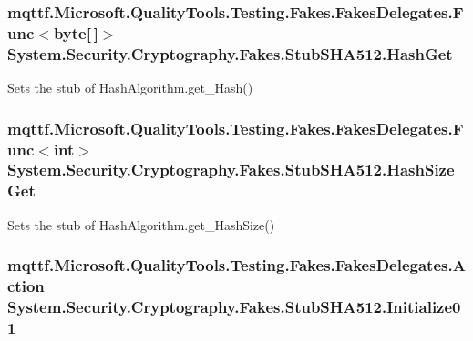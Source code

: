 \hypertarget{class_system_1_1_security_1_1_cryptography_1_1_fakes_1_1_stub_s_h_a512_acd372718f6313b93ee5cfc1d72b85fdf}{
\subsubsection[{Hash\-Get}]{\setlength{\rightskip}{0pt plus 5cm}mqttf.\-Microsoft.\-Quality\-Tools.\-Testing.\-Fakes.\-Fakes\-Delegates.\-Func$<$byte\mbox{[}$\,$\mbox{]}$>$ System.\-Security.\-Cryptography.\-Fakes.\-Stub\-S\-H\-A512.\-Hash\-Get}}\label{class_system_1_1_security_1_1_cryptography_1_1_fakes_1_1_stub_s_h_a512_acd372718f6313b93ee5cfc1d72b85fdf}


Sets the stub of Hash\-Algorithm.\-get\-\_\-\-Hash()

\hypertarget{class_system_1_1_security_1_1_cryptography_1_1_fakes_1_1_stub_s_h_a512_af24ff32e49acd188601a70b1a90f7224}{
\subsubsection[{Hash\-Size\-Get}]{\setlength{\rightskip}{0pt plus 5cm}mqttf.\-Microsoft.\-Quality\-Tools.\-Testing.\-Fakes.\-Fakes\-Delegates.\-Func$<$int$>$ System.\-Security.\-Cryptography.\-Fakes.\-Stub\-S\-H\-A512.\-Hash\-Size\-Get}}\label{class_system_1_1_security_1_1_cryptography_1_1_fakes_1_1_stub_s_h_a512_af24ff32e49acd188601a70b1a90f7224}


Sets the stub of Hash\-Algorithm.\-get\-\_\-\-Hash\-Size()

\hypertarget{class_system_1_1_security_1_1_cryptography_1_1_fakes_1_1_stub_s_h_a512_a028ddc4d7c18ad6ec03a0d3f475b8e89}{
\subsubsection[{Initialize01}]{\setlength{\rightskip}{0pt plus 5cm}mqttf.\-Microsoft.\-Quality\-Tools.\-Testing.\-Fakes.\-Fakes\-Delegates.\-Action System.\-Security.\-Cryptography.\-Fakes.\-Stub\-S\-H\-A512.\-Initialize01}}\label{class_system_1_1_security_1_1_cryptography_1_1_fakes_1_1_stub_s_h_a512_a028ddc4d7c18ad6ec03a0d3f475b8e89}


